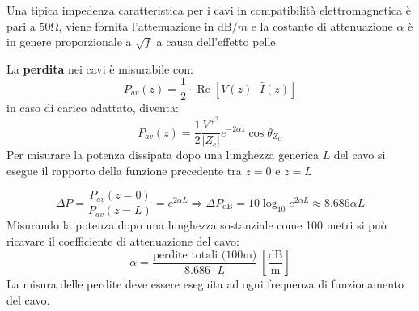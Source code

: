 Una tipica impedenza caratteristica per i cavi in compatibilità elettromagnetica è pari a $50 \si{\ohm}$, 
viene fornita l'attenuazione in $\si{\dB}/m$ e la costante di attenuazione $\alpha$ è in genere 
proporzionale a $\sqrt{f}$ a causa dell'effetto pelle.

La \textbf{perdita} nei cavi è misurabile con:
$$
P_{av} (z) = \frac{1}{2} \cdot \operatorname{Re}\left[V(z)\cdot \bar{I}(z) \right]
$$
in caso di carico adattato, diventa:
$$
P_{av}(z) = \frac{1}{2}\frac{V^{+^2}}{\left|Z_c \right|} e^{-2\alpha z} \cos{\theta_{Z_C}}
$$
Per misurare la potenza dissipata dopo una lunghezza generica $L$ del cavo si esegue il rapporto della funzione 
precedente tra $z = 0$ e $z = L$

$$
\Delta P = \frac{P_{av}(z = 0)}{P_{av} (z = L)} = e^{2\alpha L} \Rightarrow \Delta P_{\si{\dB}} = 
10\log_{10} e^{2\alpha L} \approx 8.686 \alpha L
$$
Misurando la potenza dopo una lunghezza sostanziale come 100 metri si può ricavare il coefficiente di attenuazione
del cavo:
$$
\alpha = \frac{\text{perdite totali (100m)}}{8.686 \cdot L}\ \left[\frac{\si{\dB}}{\si{\m}}\right]
$$
La misura delle perdite deve essere eseguita ad ogni frequenza di funzionamento del cavo.
